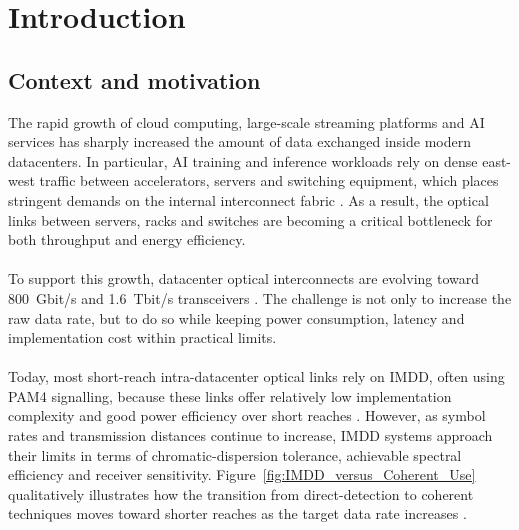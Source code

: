 
\chapter{Introduction}
\section{Context and motivation}
The rapid growth of cloud computing, large-scale streaming platforms and AI services has sharply increased the amount of data exchanged inside modern datacenters. In particular, AI training and inference workloads rely on dense east-west traffic between accelerators, servers and switching equipment, which places stringent demands on the internal interconnect fabric \cite{Blumenthal2020JLT,Zhang2025OJSSCS}. As a result, the optical links between servers, racks and switches are becoming a critical bottleneck for both throughput and energy efficiency.
\\\\
To support this growth, datacenter optical interconnects are evolving toward 800~Gbit/s and 1.6~Tbit/s transceivers \cite{Zhou2023OFC,Zhou2020JLT}. The challenge is not only to increase the raw data rate, but to do so while keeping power consumption, latency and implementation cost within practical limits.
\\\\
Today, most short-reach intra-datacenter optical links rely on \ac{IMDD}, often using \ac{PAM4} signalling, because these links offer relatively low implementation complexity and good power efficiency over short reaches \cite{Zhou2020JLT,Zhang2025OJSSCS}. However, as symbol rates and transmission distances continue to increase, \ac{IMDD} systems approach their limits in terms of chromatic-dispersion tolerance, achievable spectral efficiency and receiver sensitivity. Figure~\ref{fig:IMDD_versus_Coherent_Use} qualitatively illustrates how the transition from direct-detection to coherent techniques moves toward shorter reaches as the target data rate increases \cite{Zhou2020JLT,Seiler2021FOE}.

